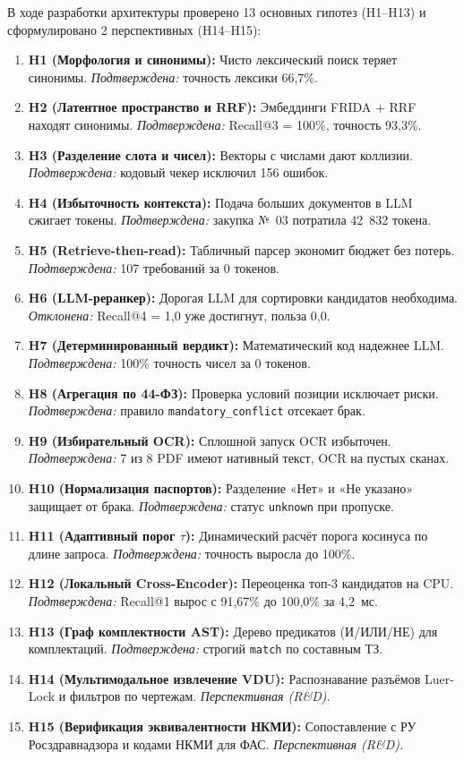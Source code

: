 \documentclass[10pt,a4paper]{article}
\begin{document}
В ходе разработки архитектуры проверено 13 основных гипотез (H1--H13) и сформулировано 2 перспективных (H14--H15):
\begin{enumerate}[leftmargin=1.1em, itemsep=2.2pt, topsep=2pt, parsep=0pt]
  \item \textbf{H1 (Морфология и синонимы):} Чисто лексический поиск теряет синонимы. \emph{Подтверждена:} точность лексики 66,7\%.
  \item \textbf{H2 (Латентное пространство и RRF):} Эмбеддинги FRIDA + RRF находят синонимы. \emph{Подтверждена:} Recall@3 = 100\%, точность 93,3\%.
  \item \textbf{H3 (Разделение слота и чисел):} Векторы с числами дают коллизии. \emph{Подтверждена:} кодовый чекер исключил 156 ошибок.
  \item \textbf{H4 (Избыточность контекста):} Подача больших документов в LLM сжигает токены. \emph{Подтверждена:} закупка №~03 потратила 42~832 токена.
  \item \textbf{H5 (Retrieve-then-read):} Табличный парсер экономит бюджет без потерь. \emph{Подтверждена:} 107 требований за 0 токенов.
  \item \textbf{H6 (LLM-реранкер):} Дорогая LLM для сортировки кандидатов необходима. \emph{Отклонена:} Recall@4 = 1,0 уже достигнут, польза 0,0.
  \item \textbf{H7 (Детерминированный вердикт):} Математический код надежнее LLM. \emph{Подтверждена:} 100\% точность чисел за 0 токенов.
  \item \textbf{H8 (Агрегация по 44-ФЗ):} Проверка условий позиции исключает риски. \emph{Подтверждена:} правило \texttt{mandatory\_conflict} отсекает брак.
  \item \textbf{H9 (Избирательный OCR):} Сплошной запуск OCR избыточен. \emph{Подтверждена:} 7 из 8 PDF имеют нативный текст, OCR на пустых сканах.
  \item \textbf{H10 (Нормализация паспортов):} Разделение «Нет» и «Не указано» защищает от брака. \emph{Подтверждена:} статус \texttt{unknown} при пропуске.
  \item \textbf{H11 (Адаптивный порог $\tau$):} Динамический расчёт порога косинуса по длине запроса. \emph{Подтверждена:} точность выросла до 100\%.
  \item \textbf{H12 (Локальный Cross-Encoder):} Переоценка топ-3 кандидатов на CPU. \emph{Подтверждена:} Recall@1 вырос с 91,67\% до 100,0\% за 4,2~мс.
  \item \textbf{H13 (Граф комплектности AST):} Дерево предикатов (И/ИЛИ/НЕ) для комплектаций. \emph{Подтверждена:} строгий \texttt{match} по составным ТЗ.
  \item \textbf{H14 (Мультимодальное извлечение VDU):} Распознавание разъёмов Luer-Lock и фильтров по чертежам. \emph{Перспективная (R\&D).}
  \item \textbf{H15 (Верификация эквивалентности НКМИ):} Сопоставление с РУ Росздравнадзора и кодами НКМИ для ФАС. \emph{Перспективная (R\&D).}
\end{enumerate}
\end{document}

